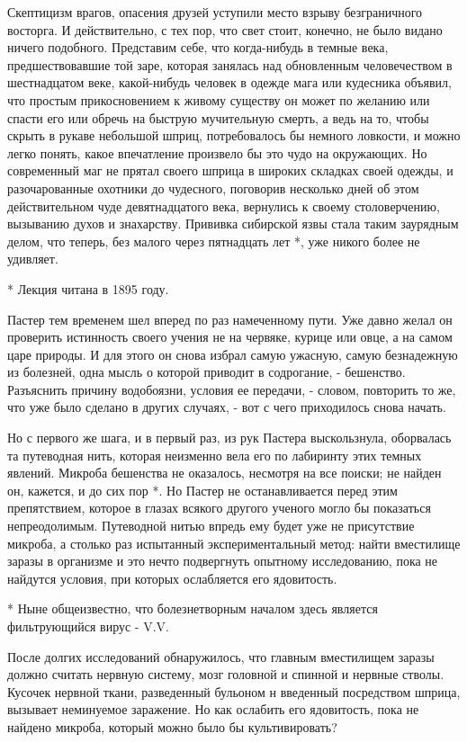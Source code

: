 Скептицизм врагов, опасения друзей  уступили место взрыву  безграничного
восторга. И действительно, с тех пор,  что свет стоит, конечно, не  было
видано ничего  подобного. Представим  себе,  что когда-нибудь  в  темные
века,  предшествовавшие  той  заре,  которая  занялась  над  обновленным
человечеством в шестнадцатом  веке, какой-нибудь человек  в одежде  мага
или кудесника объявил, что простым  прикосновением к живому существу  он
может по  желанию  или спасти  его  или обречь  на  быструю  мучительную
смерть,  а  ведь  на  то,   чтобы  скрыть  в  рукаве  небольшой   шприц,
потребовалось  бы  немного  ловкости,   и  можно  легко  понять,   какое
впечатление произвело бы это чудо  на окружающих. Но современный маг  не
прятал своего шприца в широких  складках своей одежды, и  разочарованные
охотники до чудесного, поговорив  несколько дней об этом  действительном
чуде девятнадцатого века,  вернулись к  своему столоверчению,  вызыванию
духов и знахарству. Прививка сибирской язвы стала таким заурядным делом,
что теперь,  без малого  через пятнадцать  лет *,  уже никого  более  не
удивляет.

* Лекция читана в 1895 году.

Пастер тем временем шел вперед по раз намеченному пути. Уже давно  желал
он проверить истинность своего учения не на червяке, курице или овце,  а
на самом царе природы. И для этого он снова избрал самую ужасную,  самую
безнадежную из болезней, одна мысль  о которой приводит в содрогание,  -
бешенство. Разъяснить причину водобоязни, условия ее передачи, - словом,
повторить то же, что  уже было сделано  в других случаях,  - вот с  чего
приходилось снова начать.

Но с  первого же  шага, и  в первый  раз, из  рук Пастера  выскользнула,
оборвалась та путеводная нить, которая  неизменно вела его по  лабиринту
этих темных явлений.  Микроба бешенства  не оказалось,  несмотря на  все
поиски;  не  найден  он,  кажется,  и  до  сих  пор  *.  Но  Пастер   не
останавливается  перед  этим  препятствием,  которое  в  глазах  всякого
другого ученого  могло  бы показаться  непреодолимым.  Путеводной  нитью
впредь ему будет уже  не присутствие микроба,  а столько раз  испытанный
экспериментальный метод: найти вместилище заразы в организме и это нечто
подвергнуть опытному исследованию, пока не найдутся условия, при которых
ослабляется его ядовитость.

* Ныне общеизвестно, что болезнетворным началом здесь является
фильтрующийся вирус - V.V.

После долгих исследований обнаружилось,  что главным вместилищем  заразы
должно считать  нервную  систему,  мозг головной  и  спинной  и  нервные
стволы.  Кусочек  нервной  ткани,   разведенный  бульоном  н   введенный
посредством шприца, вызывает неминуемое  заражение. Но как ослабить  его
ядовитость,  пока   не   найдено   микроба,  который   можно   было   бы
культивировать?

